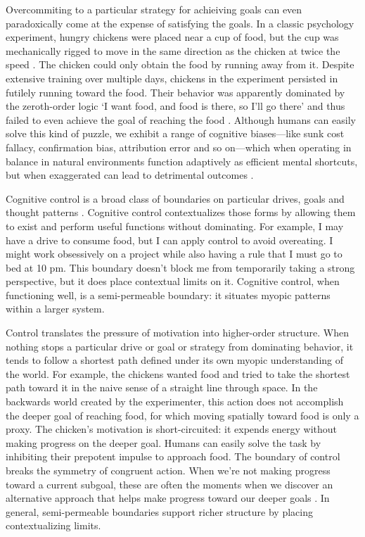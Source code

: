 \documentclass[12pt]{article}
\begin{document}
Overcommiting to a particular strategy for achieiving goals can even paradoxically come at the expense of satisfying the goals. In a classic psychology experiment, hungry chickens were placed near a cup of food, but the cup was mechanically rigged to move in the same direction as the chicken at twice the speed \citep{hershberger1986approach}. The chicken could only obtain the food by running away from it. Despite extensive training over multiple days, chickens in the experiment persisted in futilely running toward the food. Their behavior was apparently dominated by the zeroth-order logic `I want food, and food is there, so I'll go there' and thus failed to even achieve the goal of reaching the food \citep{dayan2006misbehavior, van2012information, o2017learning}. Although humans can easily solve this kind of puzzle, we exhibit a range of cognitive biases---like sunk cost fallacy, confirmation bias, attribution error and so on---which when operating in balance in natural environments function adaptively as efficient mental shortcuts, but when exaggerated can lead to detrimental outcomes \citep{guitart2014action, kahneman2011thinking, gilovich2002heuristics}.

Cognitive control is a broad class of boundaries on particular drives, goals and thought patterns \citep{botvinick2001conflict, braver2012variable, miyake2000unity, miller2001integrative}. Cognitive control contextualizes those forms by allowing them to exist and perform useful functions without dominating. For example, I may have a drive to consume food, but I can apply control to avoid overeating. I might work obsessively on a project while also having a rule that I must go to bed at 10 pm. This boundary doesn't block me from temporarily taking a strong perspective, but it does place contextual limits on it. Cognitive control, when functioning well, is a semi-permeable boundary: it situates myopic patterns within a larger system. 

Control translates the pressure of motivation into higher-order structure. When nothing stops a particular drive or goal or strategy from dominating behavior, it tends to follow a shortest path defined under its own myopic understanding of the world. For example, the chickens wanted food and tried to take the shortest path toward it in the naive sense of a straight line through space. In the backwards world created by the experimenter, this action does not accomplish the deeper goal of reaching food, for which moving spatially toward food is only a proxy. The chicken's motivation is short-circuited: it expends energy without making progress on the deeper goal. Humans can easily solve the task by inhibiting their prepotent impulse to approach food. The boundary of control breaks the symmetry of congruent action. When we're not making progress toward a current subgoal, these are often the moments when we discover an alternative approach that helps make progress toward our deeper goals \citep{wrosch2003adaptive,duncker1945on,ohlsson1992information, kaplan1990search}. In general, semi-permeable boundaries support richer structure by placing contextualizing limits.
\end{document}
